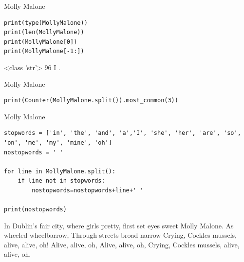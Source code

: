 \documentclass[handout]{beamer}
\begin{document}
\begin{frame}[fragile]{Molly Malone}
	
\begin{lstlisting}
print(type(MollyMalone))
print(len(MollyMalone))
print(MollyMalone[0])
print(MollyMalone[-1:])
\end{lstlisting}
	
\begin{lstlistingoutput}
<class 'str'>
96
I
.
\end{lstlistingoutput}

\end{frame}



\begin{frame}[fragile]{Molly Malone}
	
\begin{lstlisting}		
print(Counter(MollyMalone.split()).most_common(3))
\end{lstlisting}
	
\begin{lstlistingoutput}
\end{lstlistingoutput}

\end{frame}



\begin{frame}[fragile]{Molly Malone}
	
\begin{lstlisting}		
stopwords = ['in', 'the', 'and', 'a','I', 'she', 'her', 'are', 'so', 'on', 'me', 'my', 'mine', 'oh']
nostopwords = ' '

for line in MollyMalone.split():
	if line not in stopwords:
		nostopwords=nostopwords+line+' '

print(nostopwords)
\end{lstlisting}
	
\begin{lstlistingoutput}
In Dublin's fair city, where girls pretty, first set eyes sweet Molly Malone. As wheeled wheelbarrow, Through streets broad narrow Crying, Cockles mussels, alive, alive, oh! Alive, alive, oh, Alive, alive, oh, Crying, Cockles mussels, alive, alive, oh. 
\end{lstlistingoutput}


\end{frame}
\end{document}
